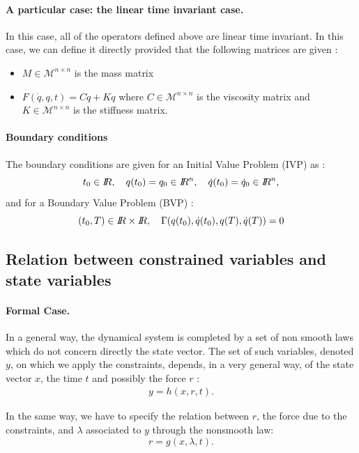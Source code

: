 \documentclass[10pt]{article}
\begin{document}
\paragraph{A particular case: the linear time invariant case.}

In this case, all of the operators defined above are linear time invariant. In this case, we can define it directly provided that the following matrices are given :
\begin{itemize}
\item $M\in \mathcal M^{n\times n}  $ is the mass matrix
\item $F(\dot q, q , t) = C \dot q + K q  $ where $ C \in \mathcal M^{n\times n}  $ is the viscosity matrix and $K \in \mathcal M^{n\times n}$   is the stiffness matrix.
\end{itemize}
\paragraph{Boundary conditions}
The boundary conditions are given for an Initial Value Problem (IVP) as :
\begin{equation}
  \label{eq:3}
  t_0 \in \mbox{\rm $I\!\!R$},\quad q(t_0)=q_0 \in \mbox{\rm $I\!\!R$}^{n}, \quad \dot q(t_0)=\dot q_0\in \mbox{\rm $I\!\!R$}^{n},
\end{equation}and for a Boundary Value Problem (BVP) :
\begin{equation}
  \label{eq:4}
   (t_0,T) \in \mbox{\rm $I\!\!R$}\times \mbox{\rm $I\!\!R$} , \quad \Gamma(q(t_0),\dot q(t_0),q(T),\dot q(T))=0
\end{equation}



\subsection{Relation between constrained variables and state variables}


\paragraph{Formal Case.} In a general way, the dynamical system is completed by a set of non smooth laws which do not  concern  directly the state vector. The set of such variables, denoted $y$, on which we apply the constraints, depends, in a very general way, of the state vector $x$, the time $t$ and possibly the force $r$ :
\begin{eqnarray}
  \label{eq:y}
  y=h(x,r,t).
\end{eqnarray}

In the same way, we have to specify the relation between $r$, the force due to the constraints, and $\lambda$ associated to $y$ through the nonsmooth law:
\begin{equation}
  \label{eq:5}
  r=g(x, \lambda,t).
\end{equation}
\end{document}
